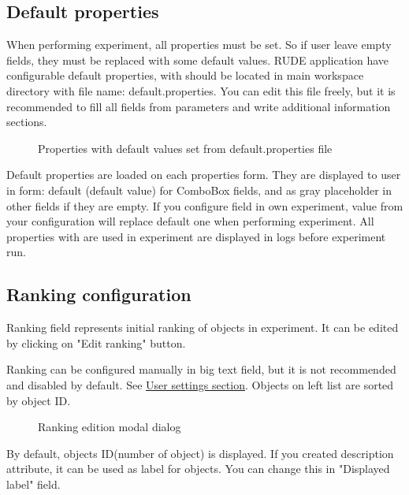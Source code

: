 \subsection{Default properties}\label{sub:properties-default}

When performing experiment, all properties must be set. So if user leave empty fields, they must be replaced with some default values. RUDE application have configurable default properties, with should be located in main workspace directory with file name: default.properties. You can edit this file freely, but it is recommended to fill all fields from parameters and write additional information sections.

\begin{figure*}[!ht] 
	\centering
	\caption{Properties with default values set from default.properties file}
\end{figure*}

Default properties are loaded on each properties form. They are displayed to user in form: default (default value) for ComboBox fields, and as gray placeholder in other fields if they are empty. If you configure field in own experiment, value from your configuration will replace default one when performing experiment. All properties with are used in experiment are displayed in logs before experiment run.


\subsection{Ranking configuration}\label{sub:properties-ranking}

Ranking field represents initial ranking of objects in experiment. It can be edited by clicking on "Edit ranking" button.

Ranking can be configured manually in big text field, but it is not recommended and disabled by default. See \hyperref[section:user-settings]{User settings section}. Objects on left list are sorted by object ID.

\begin{figure*}[!ht] 
	\centering
	\caption{Ranking edition modal dialog}
\end{figure*}

By default, objects ID(number of object) is displayed. If you created description attribute, it can be used as label for objects. You can change this in "Displayed label" field.

